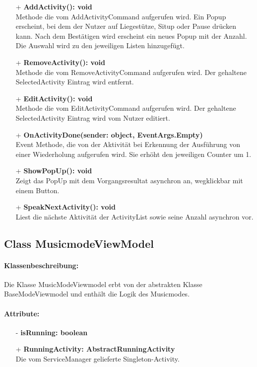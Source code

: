 \documentclass[a4paper,12pt]{article}
\begin{document}
\begin{itemize}
	\item[+] \textbf{ AddActivity(): void} \\  Methode die vom AddActivityCommand aufgerufen wird. Ein Popup erscheint, bei dem der Nutzer auf Liegestütze, Situp oder Pause drücken kann. Nach dem Bestätigen wird erscheint ein neues Popup mit der Anzahl. Die Auswahl wird zu den jeweiligen Listen hinzugefügt. 
	\item[+] \textbf{RemoveActivity(): void} \\  Methode die vom RemoveActivityCommand aufgerufen wird. Der gehaltene SelectedActivity Eintrag wird entfernt. 
	\item[+] \textbf{EditActivity(): void} \\ Methode die vom EditActivityCommand aufgerufen wird. Der gehaltene SelectedActivity Eintrag wird vom Nutzer editiert.
	\item[+] \textbf{ OnActivityDone(sender: object, EventArgs.Empty)} \\ Event Methode, die von der Aktivität bei Erkennung der Ausführung von einer Wiederholung aufgerufen wird. Sie erhöht den jeweiligen Counter um 1.  
	\item[+] \textbf{ShowPopUp(): void} \\ Zeigt das PopUp mit dem Vorgangsresultat asynchron an, wegklickbar mit einem Button. 
	\item[+] \textbf{SpeakNextActivity(): void} \\ Liest die nächste Aktivität der ActivityList sowie seine Anzahl asynchron vor. 
\end{itemize}

\subsection{Class MusicmodeViewModel}
\paragraph{Klassenbeschreibung:}
Die Klasse MusicModeViewmodel erbt von der abstrakten Klasse BaseModeViewmodel und enthält die Logik des Musicmodes.
\paragraph{Attribute:}
\begin{itemize}
	\item[-] \textbf{isRunning: boolean}
	\item[+] \textbf{RunningActivity: AbstractRunningActivity} \\ Die vom ServiceManager gelieferte Singleton-Activity.
\end{itemize}
\end{document}

